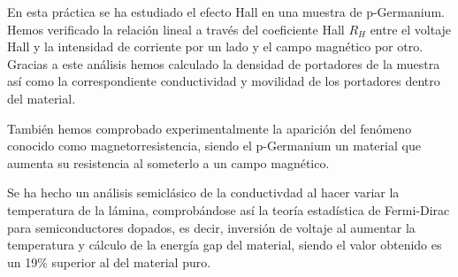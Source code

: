 En esta práctica se ha estudiado el efecto Hall en una muestra de p-Germanium. Hemos verificado la relación lineal a través del coeficiente Hall $R_H$ entre el voltaje Hall y la intensidad de corriente por un lado y el campo magnético por otro. Gracias a este análisis hemos calculado la densidad de portadores de la muestra así como la correspondiente conductividad y movilidad de los portadores dentro del material.

También hemos comprobado experimentalmente la aparición del fenómeno conocido como magnetorresistencia, siendo el p-Germanium un material que aumenta su resistencia al someterlo a un campo magnético.

Se ha hecho un análisis semiclásico de la conductivdad al hacer variar la temperatura de la lámina, comprobándose así la teoría estadística de Fermi-Dirac para semiconductores dopados, es decir, inversión de voltaje al aumentar la temperatura y cálculo de la energía gap del material, siendo el valor obtenido es un 19\% superior al del material puro.
